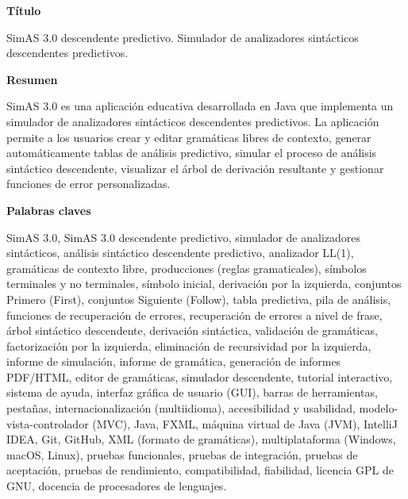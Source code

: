 \documentclass[a4paper,12pt,twoside,final]{book}
\begin{document}
\cleardoublepage

\thispagestyle{empty}
\pagecolor{white}

\Huge{\textbf{Título }}

\normalsize{SimAS 3.0 descendente predictivo. Simulador de analizadores sintácticos descendentes predictivos.}

\Large{\textbf{Resumen }}

\normalsize{SimAS 3.0 es una aplicación educativa desarrollada en Java que implementa un simulador de analizadores sintácticos descendentes predictivos. La aplicación permite a los usuarios crear y editar gramáticas libres de contexto, generar automáticamente tablas de análisis predictivo, simular el proceso de análisis sintáctico descendente, visualizar el árbol de derivación resultante y gestionar funciones de error personalizadas.}


\textbf{Palabras claves}

\normalsize{SimAS 3.0, SimAS 3.0 descendente predictivo, simulador de analizadores sintácticos, análisis sintáctico descendente predictivo, analizador LL(1), gramáticas de contexto libre, producciones (reglas gramaticales), símbolos terminales y no terminales, símbolo inicial, derivación por la izquierda, conjuntos Primero (First), conjuntos Siguiente (Follow), tabla predictiva, pila de análisis, funciones de recuperación de errores, recuperación de errores a nivel de frase, árbol sintáctico descendente, derivación sintáctica, validación de gramáticas, factorización por la izquierda, eliminación de recursividad por la izquierda, informe de simulación, informe de gramática, generación de informes PDF/HTML, editor de gramáticas, simulador descendente, tutorial interactivo, sistema de ayuda, interfaz gráfica de usuario (GUI), barras de herramientas, pestañas, internacionalización (multiidioma), accesibilidad y usabilidad, modelo-vista-controlador (MVC), Java, FXML, máquina virtual de Java (JVM), IntelliJ IDEA, Git, GitHub, XML (formato de gramáticas), multiplataforma (Windows, macOS, Linux), pruebas funcionales, pruebas de integración, pruebas de aceptación, pruebas de rendimiento, compatibilidad, fiabilidad, licencia GPL de GNU, docencia de procesadores de lenguajes.}


\cleardoublepage

\thispagestyle{empty}
\pagecolor{white}
\end{document}
